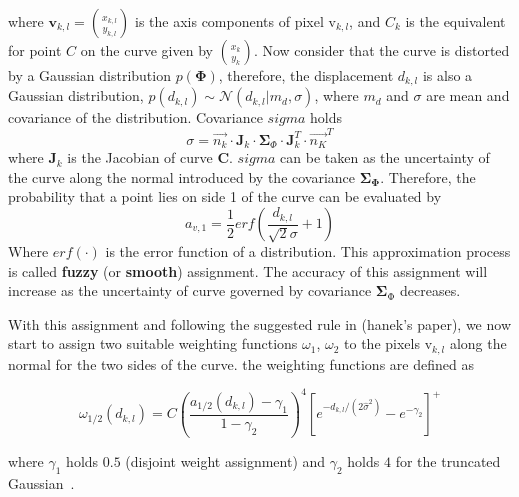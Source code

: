 where $\mathbf{v}_{k,l} = {x_{k,l} \choose y_{k,l}}$ is the axis components of pixel
$\mathrm{v}_{k,l}$, and $C_k$ is the equivalent for point $C$ on the
curve given by ${x_k \choose y_k}$. Now consider that the curve is
distorted by a Gaussian distribution $p(\mathbf{\Phi})$, therefore, the
displacement $d_{k,l}$ is also a Gaussian distribution, $p(d_{k,l}) \sim
\mathcal{N}(d_{k,l}|m_d, \sigma)$, where $m_d$ and $\sigma$ are mean
and covariance of the distribution. Covariance $sigma$ holds
\begin{equation}
  \label{eq:5.8}
  \sigma = \vec{n_k} \cdot \mathbf{J}_k \cdot \mathbf{\Sigma}_{\Phi}
  \cdot \mathbf{J}_k^T \cdot \vec{n_K}^T
\end{equation}
where $\mathbf{J}_k$ is the Jacobian of curve $\mathbf{C}$. $sigma$
can be taken as the uncertainty of the curve along the normal
introduced by the covariance $\mathbf{\Sigma}_{\mathbf{\Phi}}$.
Therefore, the probability that a point lies on side 1 of the
curve can be evaluated by
\begin{equation}
  \label{eq:5.9}
  a_{v,1} = \frac{1}{2}erf(\frac{d_{k,l}}{\sqrt{2}\sigma} + 1)
\end{equation}
Where $erf(\cdot)$ is the error function of a distribution. This
approximation process is called \textbf{fuzzy} (or \textbf{smooth})
assignment. The accuracy of this assignment will increase as the
uncertainty of curve governed by covariance
$\mathbf{\Sigma}_{\mathrm{\Phi}}$ decreases.

With this assignment and following the suggested rule in (hanek's
paper), we now start to assign two suitable weighting functions
$\omega_1$, $\omega_2$ to the pixels $\mathrm{v}_{k,l}$ along the
normal for the two sides of the curve. the weighting functions are
defined as

\begin{equation}
  \label{eq:5.10}
  \omega_{1/2}(d_{k,l}) = C\left(\frac{a_{1/2}(d_{k,l}) -
    \gamma_1}{1-\gamma_2}\right)^4 \left[e^{-d_{k,l}/(2\hat{\sigma}^2)} - e^{-\gamma_2}\right]^+
\end{equation}


where $\gamma_1$ holds $0.5$ (disjoint weight assignment) and $\gamma_2$
holds $4$ for the truncated Gaussian~\cite{hanek2004contracting}. 

